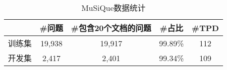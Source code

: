\begin{table}[htbp]
    \centering
    \caption{MuSiQue数据统计}
    \label{tab:2-3}
    \begin{tabular}{ccccc}
        \hline
        & \#问题 & \#包含20个文档的问题 & \#占比 & \#TPD \\
        \hline
        训练集 & 19,938 & 19,917 & 99.89\% & 112 \\
        开发集 & 2,417 & 2,401 & 99.34\% & 109 \\
        \hline
    \end{tabular}
\end{table}


